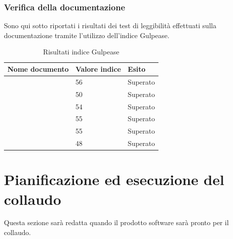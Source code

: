		\subsubsection{Verifica della documentazione}
		Sono qui sotto riportati i risultati dei test di leggibilità effettuati sulla documentazione tramite l'utilizzo dell'indice Gulpease.
		\begin{table}[!ht]
				\begin{center}
					\begin{tabularx}{0.9\textwidth}{|l|l|X|}
						\hline
						\textbf{Nome documento} & \textbf{Valore indice} & \textbf{Esito}\\
						\hline
						\docNameVersionAdR & 56 & Superato\\
						\hline
						\docNameVersionGlo & 50 & Superato\\
						\hline
						\docNameVersionNdP & 54 & Superato\\
						\hline
						\docNameVersionPdP & 55 & Superato\\
						\hline
						\docNameVersionPdQ & 55 & Superato \\
						\hline
						\docNameVersionSdF & 48 & Superato\\
						\hline
					\end{tabularx}
				\end{center}
			\caption{Risultati indice Gulpease}
			\end{table}
			
\pagebreak

\section{Pianificazione ed esecuzione del collaudo}
	Questa sezione sarà redatta quando il prodotto software sarà pronto per il collaudo.
	
	\pagebreak